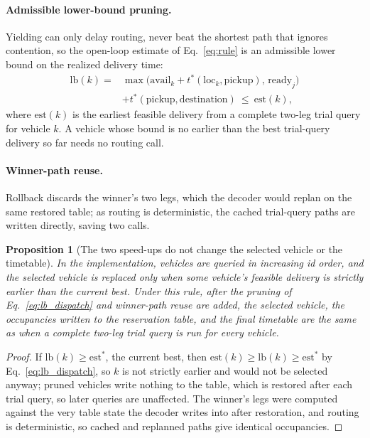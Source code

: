 \documentclass[preprint,review,12pt,authoryear,doubleblind]{elsarticle}
\newtheorem{prop}{Proposition}
\begin{document}
\paragraph{Admissible lower-bound pruning.}
Yielding can only delay routing, never beat the shortest path that ignores contention, so the open-loop estimate of Eq.~\eqref{eq:rule} is an admissible lower bound on the realized delivery time:
\begin{equation}
\label{eq:lb_dispatch}
\begin{split}
\mathrm{lb}(k)={}&\max\bigl(\mathrm{avail}_k+t^{*}(\mathrm{loc}_k,\text{pickup}),\,\mathrm{ready}_j\bigr)\\
&+t^{*}(\text{pickup},\text{destination})\ \le\ \mathrm{est}(k),
\end{split}
\end{equation}
where $\mathrm{est}(k)$ is the earliest feasible delivery from a complete two-leg trial query for vehicle $k$.
A vehicle whose bound is no earlier than the best trial-query delivery so far needs no routing call.

\paragraph{Winner-path reuse.}
Rollback discards the winner's two legs, which the decoder would replan on the same restored table; as routing is deterministic, the cached trial-query paths are written directly, saving two calls.

\begin{prop}[The two speed-ups do not change the selected vehicle or the timetable]
  \label{prop:speedup_equiv}
  In the implementation, vehicles are queried in increasing id order, and the selected vehicle is replaced only when some vehicle's feasible delivery is strictly earlier than the current best.
  Under this rule, after the pruning of Eq.~\eqref{eq:lb_dispatch} and winner-path reuse are added, the selected vehicle, the occupancies written to the reservation table, and the final timetable are the same as when a complete two-leg trial query is run for every vehicle.
\end{prop}

\begin{proof}
If $\mathrm{lb}(k)\ge\mathrm{est}^{\ast}$, the current best, then $\mathrm{est}(k)\ge\mathrm{lb}(k)\ge\mathrm{est}^{\ast}$ by Eq.~\eqref{eq:lb_dispatch}, so $k$ is not strictly earlier and would not be selected anyway; pruned vehicles write nothing to the table, which is restored after each trial query, so later queries are unaffected.
The winner's legs were computed against the very table state the decoder writes into after restoration, and routing is deterministic, so cached and replanned paths give identical occupancies.
\end{proof}
\end{document}
